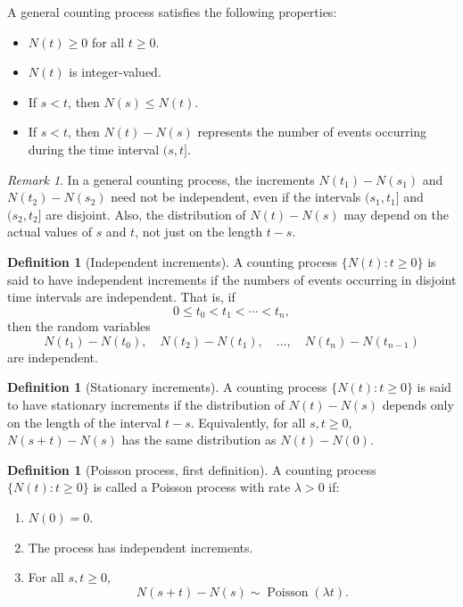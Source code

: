 \documentclass[11pt]{article}
\theoremstyle{plain}
\theoremstyle{definition}
\newtheorem{definition}[theorem]{Definition}
\theoremstyle{remark}
\newtheorem{remark}[theorem]{Remark}
\begin{document}
A general counting process satisfies the following properties:
\begin{itemize}[leftmargin=2em]
	\item \(N(t)\ge 0\) for all \(t\ge 0\).
	\item \(N(t)\) is integer-valued.
	\item If \(s<t\), then \(N(s)\le N(t)\).
	\item If \(s<t\), then \(N(t)-N(s)\) represents the number of events occurring during the time interval \((s,t]\).
\end{itemize}

\begin{remark}
	In a general counting process, the increments \(N(t_1)-N(s_1)\) and \(N(t_2)-N(s_2)\) need not be independent, even if the intervals \((s_1,t_1]\) and \((s_2,t_2]\) are disjoint. Also, the distribution of \(N(t)-N(s)\) may depend on the actual values of \(s\) and \(t\), not just on the length \(t-s\).
\end{remark}

\begin{definition}[Independent increments]
	A counting process \(\{N(t):t\ge 0\}\) is said to have independent increments if the numbers of events occurring in disjoint time intervals are independent. That is, if
	\[
	0\le t_0<t_1<\cdots<t_n,
	\]
	then the random variables
	\[
	N(t_1)-N(t_0),\quad
	N(t_2)-N(t_1),\quad
	\dots,\quad
	N(t_n)-N(t_{n-1})
	\]
	are independent.
\end{definition}

\begin{definition}[Stationary increments]
	A counting process \(\{N(t):t\ge 0\}\) is said to have stationary increments if the distribution of \(N(t)-N(s)\) depends only on the length of the interval \(t-s\). Equivalently, for all \(s,t\ge 0\), \(N(s+t)-N(s)\) has the same distribution as \(N(t)-N(0)\).
\end{definition}

\begin{definition}[Poisson process, first definition]
	A counting process \(\{N(t):t\ge 0\}\) is called a Poisson process with rate \(\lambda>0\) if:
	\begin{enumerate}[leftmargin=2em]
		\item \(N(0)=0\).
		\item The process has independent increments.
		\item For all \(s,t\ge 0\),
		\[
		N(s+t)-N(s)
		\sim
		\operatorname{Poisson}(\lambda t).
		\]
	\end{enumerate}
\end{definition}
\end{document}
